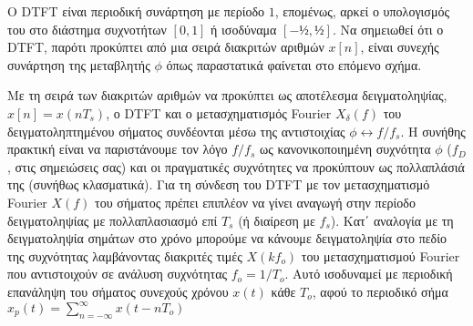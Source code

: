 \documentclass[letterpaper,10pt,english]{sphinxmanual}
\begin{document}
\sphinxAtStartPar
O DTFT είναι περιοδική συνάρτηση με περίοδο \(1\), επομένως, αρκεί ο υπολογισμός του στο
διάστημα συχνοτήτων \([0,1]\) ή ισοδύναμα \([-½,½]\). Να σημειωθεί ότι ο DTFT, παρότι προκύπτει από
μια σειρά διακριτών αριθμών \(x[n]\), είναι συνεχής συνάρτηση της μεταβλητής \(\phi\) όπως παραστατικά
φαίνεται στο επόμενο σχήμα.

\sphinxAtStartPar
Με τη σειρά των διακριτών αριθμών να προκύπτει ως αποτέλεσμα δειγματοληψίας, \(x[n]=x(nT_s)\), ο
DTFT και ο μετασχηματισμός Fourier \(X_\delta(f)\) του δειγματοληπτημένου σήματος συνδέονται μέσω
της αντιστοιχίας \(\phi ↔ f/f_s\). Η συνήθης πρακτική είναι να παριστάνουμε τον λόγο \(f/f_s\) ως
κανονικοποιημένη συχνότητα \(\phi\) (\(f_D\), στις σημειώσεις σας) και οι πραγματικές συχνότητες να
προκύπτουν ως πολλαπλάσιά της (συνήθως κλασματικά). Για τη σύνδεση του DTFT με τον μετασχηματισμό Fourier \(X(f)\) του σήματος πρέπει επιπλέον να γίνει αναγωγή στην περίοδο δειγματοληψίας με πολλαπλασιασμό επί \(T_s\) (ή διαίρεση με \(f_s\)).
Κατ΄ αναλογία με τη δειγματοληψία σημάτων στο χρόνο μπορούμε να κάνουμε δειγματοληψία στο
πεδίο της συχνότητας λαμβάνοντας διακριτές τιμές \(X(kf_o)\) του μετασχηματισμού Fourier που
αντιστοιχούν σε ανάλυση συχνότητας \(f_o=1/T_o\). Αυτό ισοδυναμεί με περιοδική επανάληψη του
σήματος συνεχούς χρόνου \(x(t)\) κάθε \(Τ_ο\), αφού το περιοδικό σήμα
\(x_p (t)=\sum_{n=-\infty}^{\infty}x(t-nT_o)\)
\end{document}
